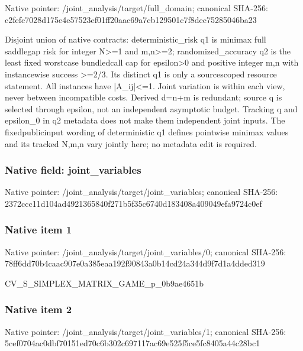 \documentclass[10pt,a4paper]{article}
\begin{document}
Native pointer: /joint\_analysis/target/full\_domain; canonical SHA-256: c2fefc7028d175e4e57523ef\allowbreak{}01ff20aac69a7cb129501c7f\allowbreak{}8dec75285046ba23


Disjoint union of native contracts: deterministic\_risk q1 is minimax full saddlegap risk for integer N>=1 and m,n>=2; randomized\_accuracy q2 is the least fixed worstcase bundledcall cap for epsilon>0 and positive integer m,n with instancewise success >=2/3. Its distinct q1 is only a sourcescoped resource statement. All instances have |A\_ij|<=1. Joint variation is within each view, never between incompatible costs. Derived d=n+m is redundant; source q is selected through epsilon, not an independent asymptotic budget. Tracking q and epsilon\_0 in q2 metadata does not make them independent joint inputs. The fixedpublicinput wording of deterministic q1 defines pointwise minimax values and its tracked N,m,n vary jointly here; no metadata edit is required.


\subsubsection{Native field: joint\_variables}


Native pointer: /joint\_analysis/target/joint\_variables; canonical SHA-256: 2372ccc11d104ad492136584\allowbreak{}0f271b5f35c6740d183408a4\allowbreak{}09049efa9724c0ef



\subsubsection{Native item 1}


Native pointer: /joint\_analysis/target/j\allowbreak{}oint\_variables/0; canonical SHA-256: 78ff6dd70b4caac907e0a385\allowbreak{}eaa192f90843a0b14cd24a34\allowbreak{}4d9f7d1a4dded319


CV\_S\_SIMPLEX\_MATRIX\_GAME\_p\_0b9ae4651b


\subsubsection{Native item 2}


Native pointer: /joint\_analysis/target/j\allowbreak{}oint\_variables/1; canonical SHA-256: 5cef0704ac0dbf70151ed70c\allowbreak{}6b302c697117ac69e525f5ce\allowbreak{}5fc8405a44c28bc1
\end{document}
